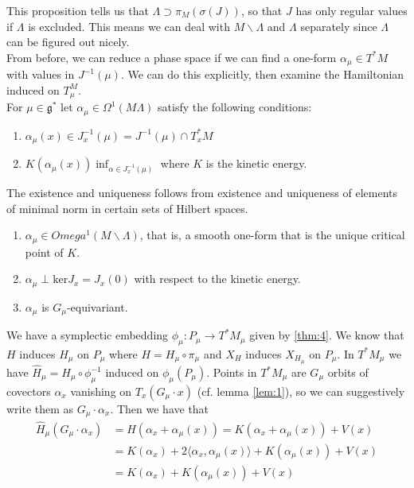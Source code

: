 This proposition tells us that $\Lambda \supset \pi_M (\sigma(J))$, so that $J$ has only regular values if $\Lambda$ is excluded. This means we can deal with $M \backslash \Lambda$ and $\Lambda$ separately since $\Lambda$ can be figured out nicely. \\
\indent From before, we can reduce a phase space if we can find a one-form $\alpha_{\mu} \in T^*M$ with values in $J^{-1}(\mu)$. We can do this explicitly, then examine the Hamiltonian induced on $T^M_{\mu}$.\\
\indent For $\mu \in \mathfrak{g}^*$ let $\alpha_{\mu} \in \Omega^1(M \Lambda)$ satisfy the following conditions:
\begin{enumerate}
    \item $\alpha_{\mu}(x) \in J_x^{-1}(\mu) = J^{-1}(\mu) \cap T_x^*M$
    \item $K(\alpha_{\mu}(x)) \inf_{\alpha \in J^{-1}_x(\mu)}$ where $K$ is the kinetic energy.
\end{enumerate}
\indent The existence and uniqueness follows from existence and uniqueness of elements of minimal norm in certain sets of Hilbert spaces.

\begin{prop}

\begin{enumerate}
    \item $\alpha_{\mu} \in Omega^1(M \backslash \Lambda)$, that is, a smooth one-form that is the unique critical point of $K$.
    \item $\alpha_{\mu} \perp \mathrm{ker}J_{x} = J_x(0)$ with respect to the kinetic energy.
    \item $\alpha_{\mu}$ is $G_{\mu}$-equivariant.
\end{enumerate}
\end{prop}

We have a symplectic embedding $\phi_{\mu}: P_{\mu} \to T^*M_{\mu}$ given by \ref{thm:4}. We know that $H$ induces $H_{\mu}$ on $P_{\mu}$ where $H = H_{\mu} \circ \pi_{\mu}$ and $X_H$ induces $X_{H_{\mu}}$ on $P_{\mu}$. In $T^*M_{\mu}$ we have $\widehat{H}_{\mu} = H_{\mu} \circ \phi^{-1}_{\mu}$ induced on $\phi_{\mu}(P_{\mu})$. Points in $T^*M_{\mu}$ are $G_{\mu}$ orbits of covectors $\alpha_x$ vanishing on $T_x(G_{\mu} \cdot x)$ (cf. lemma \ref{lem:1}), so we can suggestively write them as $G_{\mu} \cdot \alpha_x$. Then we have that 
\begin{align*}
    \widehat{H}_{\mu}(G_{\mu}\cdot \alpha_x) & = H(\alpha_x + \alpha_{\mu}(x)) = K(\alpha_x + \alpha_{\mu}(x)) + V(x) \\
    & = K(\alpha_x)+2 \langle \alpha_x, \alpha_{\mu}(x) \rangle + K(\alpha_{\mu}(x)) + V(x) \\
    & = K(\alpha_x) + K(\alpha_{\mu}(x)) + V(x)
\end{align*}

